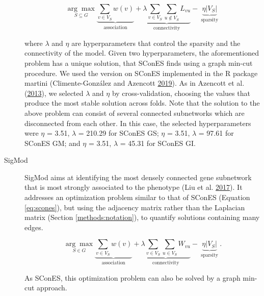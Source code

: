 \documentclass[
  11pt,
]{env/yjiao}
\begin{document}
\begin{description}
\begin{equation}
\underset{S \subseteq G}{\arg \max } \underbrace{\sum_{v \in V_S} w(v)}_{\text { association }} + \underbrace{\lambda \sum_{v \in V_S} \sum_{u \not\in V_S} L_{vu} }_{\text { connectivity }}-\underbrace{\eta \lvert V_S \rvert }_{\text { sparsity }}
\label{eq:scones}
\end{equation}

where \(\lambda\) and \(\eta\) are hyperparameters that control the
sparsity and the connectivity of the model. Given two
hyperparameters, the aforementioned problem has a unique solution,
that SConES finds using a graph min-cut procedure. We used the
version on SConES implemented in the R package martini (Climente-González and Azencott \protect\hyperlink{ref-martini}{2019}).
As in Azencott et al. (\protect\hyperlink{ref-azencott_efficient_2013}{2013}), we selected \(\lambda\) and \(\eta\)
by cross-validation, choosing the values that produce the most
stable solution across folds. Note that the solution to the above
problem can consist of several connected subnetworks which are
disconnected from each other. In this case, the selected
hyperparameters were \(\eta\) = 3.51, \(\lambda\) = 210.29 for SConES
GS; \(\eta\) = 3.51, \(\lambda\) = 97.61 for SConES GM; and \(\eta\) =
3.51, \(\lambda\) = 45.31 for SConES GI.
\item[SigMod]
SigMod aims at identifying the most densely connected gene
subnetwork that is most strongly associated to the phenotype
(Liu et al. \protect\hyperlink{ref-liu_sigmod:_2017}{2017}). It addresses an optimization problem similar to
that of SConES (Equation \eqref{eq:scones}), but using the adjacency
matrix rather than the Laplacian matrix (Section \ref{methods:notation}),
to quantify solutions containing many edges.

\[\underset{S \in G}{\arg \max } \underbrace{\sum_{v \in V_S} w(v)}_{\text { association }} + \underbrace{\lambda \sum_{v \in V_S} \sum_{u \in V_S} W_{vu} }_{\text { connectivity }} -\underbrace{\eta \lvert V_S \rvert }_{\text { sparsity }}.\]

As SConES, this optimization problem can also be solved by a graph
min-cut approach.


\end{description}
\end{document}
